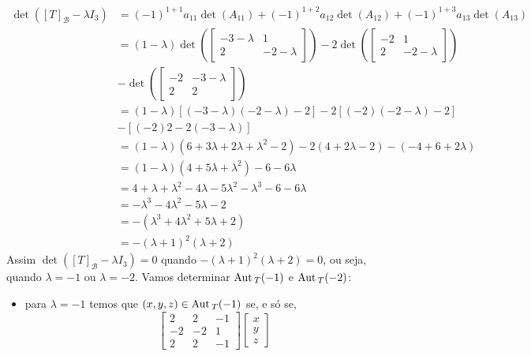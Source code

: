 \begin{exemplo}
\begin{enumerate}[label={\arabic*})]
\begin{solucao}
\begin{align*}
                \det([T]_\mathcal{B} - \lambda I_3) &= (-1)^{1 + 1}a_{11}\det(A_{11}) + (-1)^{1 + 2}a_{12}\det(A_{12}) + (-1)^{1 + 3}a_{13}\det(A_{13}) \\ &= (1 - \lambda)\det\left(\begin{bmatrix}-3 - \lambda & 1\\2 & -2 - \lambda\end{bmatrix}\right) - 2\det\left(\begin{bmatrix}-2 & 1\\2 & -2 - \lambda\end{bmatrix}\right) \\ &-\det\left(\begin{bmatrix}-2 & -3 - \lambda\\2 & 2\end{bmatrix}\right)\\ &= (1 - \lambda)[(-3 - \lambda)(-2 - \lambda) - 2] - 2[(-2)(-2 - \lambda) - 2]  \\ &- [(-2)2 - 2(-3 - \lambda)] \\ &= (1 - \lambda)(6 + 3\lambda + 2\lambda + \lambda^2 - 2) - 2(4 + 2\lambda - 2) - (-4 + 6 + 2\lambda) \\ &= (1 - \lambda)(4 + 5\lambda + \lambda^2) - 6 - 6\lambda \\ &= 4 + \lambda + \lambda^2 - 4\lambda - 5\lambda^2 - \lambda^3 - 6 - 6\lambda \\ &= -\lambda^3 - 4\lambda^2 - 5\lambda - 2 \\ &= -(\lambda^3 + 4\lambda^2 + 5\lambda + 2) \\ &= -(\lambda + 1)^2(\lambda + 2) 
            \end{align*}
            Assim $\det([T]_\mathcal{B} - \lambda I_3) = 0$ quando $-(\lambda + 1)^2(\lambda + 2) = 0$, ou seja, quando $\lambda = -1$ ou $\lambda = -2$.
            Vamos determinar ${\rm Aut\,}_T(-1)$ e ${\rm Aut\,}_T(-2)$:
            \begin{itemize}
                \item para $\lambda = -1$ temos que $(x,y,z) \in {\rm Aut\,}_T(-1)$ se, e s\'o se,
                \[
                    \begin{bmatrix}
                        2 & 2 & -1\\
                        -2 & -2 & 1\\
                        2 & 2 & -1
                    \end{bmatrix}\begin{bmatrix}
                        x\\y\\z

\end{bmatrix}\]
\end{itemize}
\end{solucao}
\end{enumerate}
\end{exemplo}
